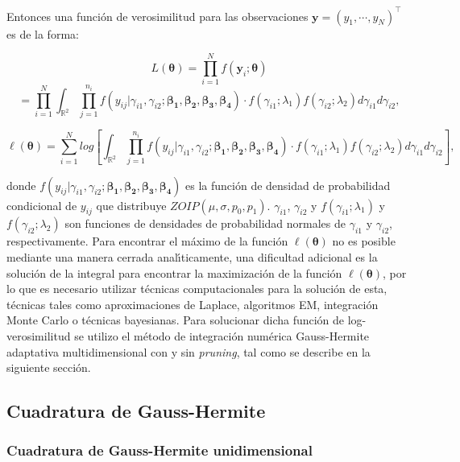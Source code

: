 Entonces una funci\'{o}n de verosimilitud para las observaciones $\mathbf{y}=(y_1, \cdots, y_N)^{\top}$ es de la forma:

\[
L(\boldsymbol{\theta})=\prod_{i=1}^{N}f(\mathbf{y}_i;\boldsymbol{\theta})
\]
\[
=\prod_{i=1}^{N}\int_{\mathbb{R}^2}\prod_{j=1}^{n_i}f(y_{ij}|\gamma_{i1},\gamma_{i2};\boldsymbol{\beta_1}, \boldsymbol{\beta_2}, \boldsymbol{\beta_3}, \boldsymbol{\beta_4})\cdot f(\gamma_{i1};\lambda_1) f(\gamma_{i2};\lambda_2) d\gamma_{i1}d\gamma_{i2},
\]

\begin{equation}
\ell(\boldsymbol{\theta})=\sum_{i=1}^{N}log \left[\int_{\mathbb{R}^2}\prod_{j=1}^{n_i}f(y_{ij}|\gamma_{i1},\gamma_{i2};\boldsymbol{\beta_1}, \boldsymbol{\beta_2}, \boldsymbol{\beta_3}, \boldsymbol{\beta_4})\cdot f(\gamma_{i1};\lambda_1) f(\gamma_{i2};\lambda_2) d\gamma_{i1}d\gamma_{i2}\right],
 \label{func_ver_mix}
\end{equation}


donde $f(y_{ij}|\gamma_{i1},\gamma_{i2};\boldsymbol{\beta_1}, \boldsymbol{\beta_2}, \boldsymbol{\beta_3}, \boldsymbol{\beta_4})$ es la funci\'{o}n de densidad de probabilidad condicional de $y_{ij}$ que distribuye $ZOIP(\mu,\sigma,p_0,p_1)$. $\gamma_{i1}$, $\gamma_{i2}$ y $f(\gamma_{i1};\lambda_1)$ y $f(\gamma_{i2};\lambda_2)$ son funciones de densidades de probabilidad normales de $\gamma_{i1}$ y $\gamma_{i2}$, respectivamente. Para encontrar el m\'{a}ximo de la funci\'{o}n $\ell(\boldsymbol{\theta})$ no es posible mediante una manera cerrada anal\'{\i}ticamente, una dificultad adicional es la soluci\'{o}n de la integral para encontrar la maximizaci\'{o}n de la funci\'{o}n $\ell(\boldsymbol{\theta})$, por lo que es necesario utilizar t\'{e}cnicas computacionales para la soluci\'{o}n de esta, t\'{e}cnicas tales como aproximaciones de Laplace, algoritmos EM, integraci\'{o}n Monte Carlo o t\'{e}cnicas bayesianas. Para solucionar dicha funci\'{o}n de log-verosimilitud se utilizo el m\'{e}todo de integraci\'{o}n num\'{e}rica Gauss-Hermite adaptativa multidimensional con y sin \textit{pruning}, tal como se describe en la siguiente secci\'{o}n.


\subsection{Cuadratura de Gauss-Hermite}\label{sec:Cuadratura}

\subsubsection{Cuadratura de Gauss-Hermite unidimensional}

